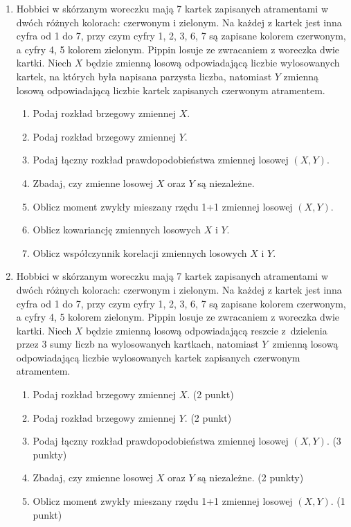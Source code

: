 \documentclass[twoside]{mwart}
\begin{document}
\begin{enumerate}
\item Hobbici w skórzanym woreczku mają 7 kartek zapisanych atramentami w dwóch różnych kolorach: czerwonym i zielonym.
Na każdej z kartek jest inna cyfra od 1 do 7, przy czym cyfry 1, 2, 3, 6, 7 są zapisane kolorem czerwonym, a cyfry 4, 5 kolorem zielonym.
Pippin losuje ze zwracaniem z woreczka dwie kartki.
Niech $X$ będzie zmienną losową odpowiadającą liczbie wylosowanych kartek, na których była napisana parzysta liczba, natomiast $Y$ zmienną losową odpowiadającą liczbie kartek zapisanych czerwonym atramentem.

\begin{enumerate}
\item Podaj rozkład brzegowy zmiennej $X$.
\item Podaj rozkład brzegowy zmiennej $Y$.
\item Podaj łączny rozkład prawdopodobieństwa zmiennej losowej $(X,Y)$.
\item Zbadaj, czy zmienne losowej $X$ oraz $Y$ są niezależne.
\item Oblicz moment zwykły mieszany rzędu 1+1 zmiennej losowej $(X,Y)$.
\item Oblicz kowariancję zmiennych losowych $X$ i $Y$.
\item Oblicz współczynnik korelacji zmiennych losowych $X$ i $Y$.
\end{enumerate}

\item Hobbici w skórzanym woreczku mają 7 kartek zapisanych atramentami w dwóch różnych kolorach: czerwonym i zielonym.
Na każdej z kartek jest inna cyfra od 1 do 7, przy czym cyfry 1, 2, 3, 6, 7 są zapisane kolorem czerwonym, a cyfry 4, 5 kolorem zielonym.
Pippin losuje ze zwracaniem z woreczka dwie kartki.
Niech $X$ będzie zmienną losową odpowiadającą reszcie z~dzielenia przez 3 sumy liczb na wylosowanych kartkach, natomiast $Y$~zmienną losową odpowiadającą liczbie wylosowanych kartek zapisanych czerwonym atramentem.

\begin{enumerate}
\item Podaj rozkład brzegowy zmiennej $X$. (2 punkt)
\item Podaj rozkład brzegowy zmiennej $Y$. (2 punkt)
\item Podaj łączny rozkład prawdopodobieństwa zmiennej losowej $(X,Y)$. (3 punkty)
\item Zbadaj, czy zmienne losowej $X$ oraz $Y$ są niezależne. (2 punkty)
\item Oblicz moment zwykły mieszany rzędu 1+1 zmiennej losowej $(X,Y)$. (1 punkt)
\end{enumerate}


\end{enumerate}
\end{document}
